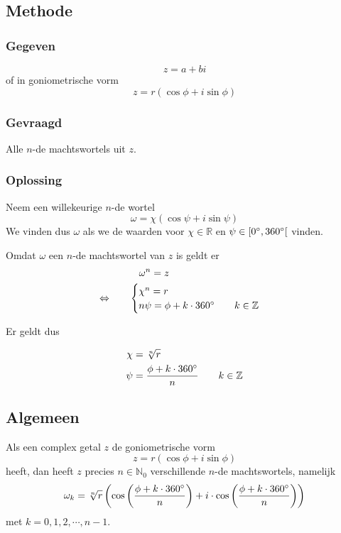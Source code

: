 \documentclass[12pt,twoside,a4paper]{article}
\begin{document}
\subsection{Methode}

\subsubsection*{Gegeven}
\[z=a+bi\]
of in goniometrische vorm
\[z=r(\cos\phi + i\sin\phi)\]

\subsubsection*{Gevraagd}
Alle $n$-de machtswortels uit $z$.

\subsubsection*{Oplossing}
Neem een willekeurige $n$-de wortel
\[\omega = \chi ( \cos \psi + i \sin \psi ) \]
We vinden dus $\omega$ als we de waarden voor $\chi\in\mathbb{R}$ en $\psi\in[0^\circ,360^\circ[$ vinden.

Omdat $\omega$ een $n$-de machtswortel van $z$ is geldt er
\begin{align*}
       & \quad \omega^n = z\\
  \Leftrightarrow \qquad & \begin{cases} \chi^n = r\\ n\psi = \phi + k \cdot 360^\circ \qquad k\in\mathbb{Z} \end{cases}
\end{align*}

Er geldt dus
\begin{mdframed}
  \begin{align*}
    \chi &= \sqrt[n]{r}\\
    \psi &= \dfrac{\phi + k \cdot 360^\circ}{n} \qquad k\in\mathbb{Z}
  \end{align*}
\end{mdframed}

\subsection{Algemeen}

Als een complex getal $z$ de goniometrische vorm
\[ z = r ( \cos \phi + i \sin \phi )\]
heeft, dan heeft $z$ precies $n\in\mathbb{N}_0$ verschillende $n$-de machtswortels, namelijk
\[ \omega_k = \sqrt[n]{r}\left( \cos\left( \dfrac{\phi + k \cdot 360^\circ}{n} \right) + i \cdot \cos\left( \dfrac{\phi + k \cdot 360^\circ}{n} \right) \right)\]
met $k = 0, 1, 2, \cdots , n-1$.
\end{document}
